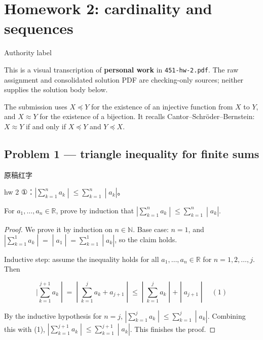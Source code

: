 \chapter{Homework 2: cardinality and sequences}

\begin{qlremark}{Authority label}

This is a visual transcription of \textbf{personal work} in \texttt{451-hw-2.pdf}. The raw assignment and consolidated solution PDF are checking-only sources; neither supplies the solution body below.

\end{qlremark}

The submission uses \(X \preceq Y\) for the existence of an injective function from \(X\) to \(Y\), and \(X \approx Y\) for the existence of a bijection. It recalls Cantor--Schröder--Bernstein: \(X \approx Y\) if and only if \(X \preceq Y\) and \(Y \preceq X\).

\section{Problem 1 --- triangle inequality for finite sums}

\begin{qlnote}{原稿红字}

hw 2 ①：\(\left. |\sum_{k = 1}^{n}a_{k} \middle| \leq \sum_{k = 1}^{n} \middle| a_{k}| \right.\)。

\end{qlnote}

For \(a_{1},\ldots,a_{n} \in \mathbb{R}\), prove by induction that \(\left. |\sum_{k = 1}^{n}a_{k} \middle| \leq \sum_{k = 1}^{n} \middle| a_{k}| \right.\).

\begin{proof}

We prove it by induction on \(n \in \mathbb{N}\). Base case: \(n = 1\), and \(\left. |\sum_{k = 1}^{1}a_{k} \middle| = \middle| a_{1} \middle| = \sum_{k = 1}^{1} \middle| a_{k}| \right.\), so the claim holds.

Inductive step: assume the inequality holds for all \(a_{1},\ldots,a_{n} \in \mathbb{R}\) for \(n = 1,2,\ldots,j\). Then

\[\left. |\sum\limits_{k = 1}^{j + 1}a_{k} \middle| = \middle| \sum\limits_{k = 1}^{j}a_{k} + a_{j + 1} \middle| \leq \middle| \sum\limits_{k = 1}^{j}a_{k} \middle| + \middle| a_{j + 1} \middle| \quad(1) \right.\]

By the inductive hypothesis for \(n = j\), \(\left. |\sum_{k = 1}^{j}a_{k} \middle| \leq \sum_{k = 1}^{j} \middle| a_{k}| \right.\). Combining this with (1), \(\left. |\sum_{k = 1}^{j + 1}a_{k} \middle| \leq \sum_{k = 1}^{j + 1} \middle| a_{k}| \right.\). This finishes the proof.

\end{proof}

